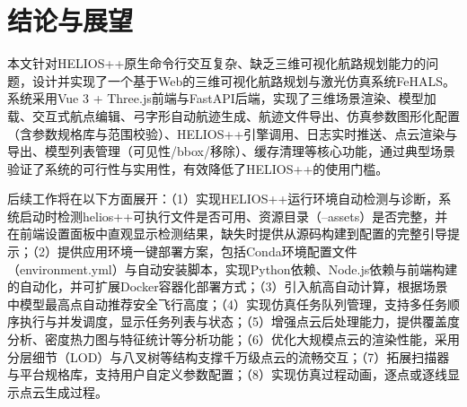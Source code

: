 \documentclass[a4paper,fleqn]{cas-sc}
\begin{document}
\section{结论与展望}\label{sec:conclusion}
本文针对HELIOS++原生命令行交互复杂、缺乏三维可视化航路规划能力的问题，设计并实现了一个基于Web的三维可视化航路规划与激光仿真系统FeHALS。系统采用Vue 3 + Three.js前端与FastAPI后端，实现了三维场景渲染、模型加载、交互式航点编辑、弓字形自动航迹生成、航迹文件导出、仿真参数图形化配置（含参数规格库与范围校验）、HELIOS++引擎调用、日志实时推送、点云渲染与导出、模型列表管理（可见性/bbox/移除）、缓存清理等核心功能，通过典型场景验证了系统的可行性与实用性，有效降低了HELIOS++的使用门槛。

后续工作将在以下方面展开：（1）实现HELIOS++运行环境自动检测与诊断，系统启动时检测helios++可执行文件是否可用、资源目录（--assets）是否完整，并在前端设置面板中直观显示检测结果，缺失时提供从源码构建到配置的完整引导提示；（2）提供应用环境一键部署方案，包括Conda环境配置文件（environment.yml）与自动安装脚本，实现Python依赖、Node.js依赖与前端构建的自动化，并可扩展Docker容器化部署方式；（3）引入航高自动计算，根据场景中模型最高点自动推荐安全飞行高度；（4）实现仿真任务队列管理，支持多任务顺序执行与并发调度，显示任务列表与状态；（5）增强点云后处理能力，提供覆盖度分析、密度热力图与特征统计等分析功能；（6）优化大规模点云的渲染性能，采用分层细节（LOD）与八叉树等结构支撑千万级点云的流畅交互；（7）拓展扫描器与平台规格库，支持用户自定义参数配置；（8）实现仿真过程动画，逐点或逐线显示点云生成过程。

\printcredits




\end{document}
